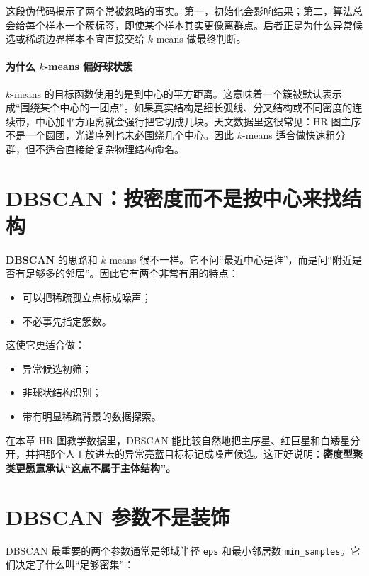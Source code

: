 这段伪代码揭示了两个常被忽略的事实。第一，初始化会影响结果；第二，算法总会给每个样本一个簇标签，即使某个样本其实更像离群点。后者正是为什么异常候选或稀疏边界样本不宜直接交给 $k$-means 做最终判断。

\paragraph{为什么 \texorpdfstring{$k$-means}{k-means} 偏好球状簇}

\(k\)-means 的目标函数使用的是到中心的平方距离。这意味着一个簇被默认表示成“围绕某个中心的一团点”。如果真实结构是细长弧线、分叉结构或不同密度的连续带，中心加平方距离就会强行把它切成几块。天文数据里这很常见：HR 图主序不是一个圆团，光谱序列也未必围绕几个中心。因此 \(k\)-means 适合做快速粗分群，但不适合直接给复杂物理结构命名。

\section{DBSCAN：按密度而不是按中心来找结构}

\textbf{DBSCAN} 的思路和 $k$-means 很不一样。它不问“最近中心是谁”，而是问“附近是否有足够多的邻居”。因此它有两个非常有用的特点：

\begin{itemize}
    \item 可以把稀疏孤立点标成噪声；
    \item 不必事先指定簇数。
\end{itemize}

这使它更适合做：

\begin{itemize}
    \item 异常候选初筛；
    \item 非球状结构识别；
    \item 带有明显稀疏背景的数据探索。
\end{itemize}

在本章 HR 图教学数据里，DBSCAN 能比较自然地把主序星、红巨星和白矮星分开，并把那个人工放进去的异常亮蓝目标标记成噪声候选。这正好说明：\textbf{密度型聚类更愿意承认“这点不属于主体结构”。}

\section{DBSCAN 参数不是装饰}

DBSCAN 最重要的两个参数通常是邻域半径 \texttt{eps} 和最小邻居数 \texttt{min\_samples}。它们决定了什么叫“足够密集”：

